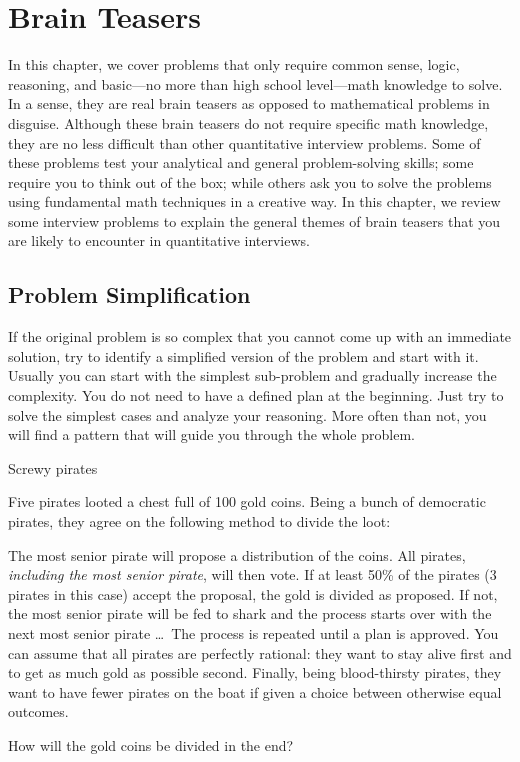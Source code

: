 
\section{Brain Teasers}

In this chapter, we cover problems that only require common sense, logic, reasoning, and
basic---no more than high school level---math knowledge to solve. In a sense, they are
real brain teasers as opposed to mathematical problems in disguise. Although these brain
teasers do not require specific math knowledge, they are no less difficult than other
quantitative interview problems. Some of these problems test your analytical and general
problem-solving skills; some require you to think out of the box; while others ask you to
solve the problems using fundamental math techniques in a creative way. In this chapter,
we review some interview problems to explain the general themes of brain teasers that
you are likely to encounter in quantitative interviews.

\subsection{Problem Simplification}

If the original problem is so complex that you cannot come up with an immediate
solution, try to identify a simplified version of the problem and start with it. Usually you
can start with the simplest sub-problem and gradually increase the complexity. You do
not need to have a defined plan at the beginning. Just try to solve the simplest cases and
analyze your reasoning. More often than not, you will find a pattern that will guide you
through the whole problem.

\begin{problem}{Screwy pirates}

Five pirates looted a chest full of 100 gold coins. Being a bunch of democratic pirates,
they agree on the following method to divide the loot:

The most senior pirate will propose a distribution of the coins. All pirates, \emph{including the
most senior pirate}, will then vote. If at least 50\% of the pirates (3 pirates in this case)
accept the proposal, the gold is divided as proposed. If not, the most senior pirate will be
fed to shark and the process starts over with the next most senior pirate \ldots\ The process is
repeated until a plan is approved. You can assume that all pirates are perfectly rational:
they want to stay alive first and to get as much gold as possible second. Finally, being
blood-thirsty pirates, they want to have fewer pirates on the boat if given a choice between
otherwise equal outcomes.

How will the gold coins be divided in the end?
\end{problem}

